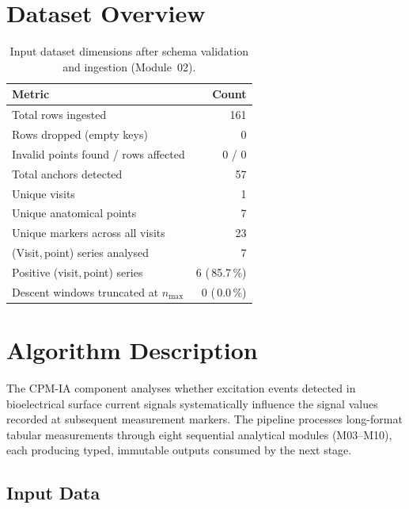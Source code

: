 \documentclass[a4paper,11pt]{article}
\begin{document}
\section{Dataset Overview}

\begin{table}[h!]
\centering
\small
\caption{Input dataset dimensions after schema validation and ingestion (Module~02).}
\begin{tabular}{lr}
\toprule
\textbf{Metric} & \textbf{Count} \\
\midrule
Total rows ingested                        & 161 \\
Rows dropped (empty keys)                  & 0 \\
Invalid points found / rows affected       & 0 / 0 \\
Total anchors detected                     & 57 \\
Unique visits                          & 1 \\
Unique anatomical points               & 7 \\
Unique markers across all visits       & 23 \\
(Visit,\,point) series analysed        & 7 \\
Positive (visit,\,point) series        & 6 (\,85.7\,\%) \\
Descent windows truncated at $n_{\max}$ & 0 (\,0.0\,\%) \\
\bottomrule
\end{tabular}
\end{table}

\section{Algorithm Description}

The CPM-IA component analyses whether excitation events detected in bioelectrical surface
current signals systematically influence the signal values recorded at subsequent measurement
markers. The pipeline processes long-format tabular measurements through eight sequential
analytical modules (M03--M10), each producing typed, immutable outputs consumed by the next
stage.

\subsection{Input Data}
\end{document}
